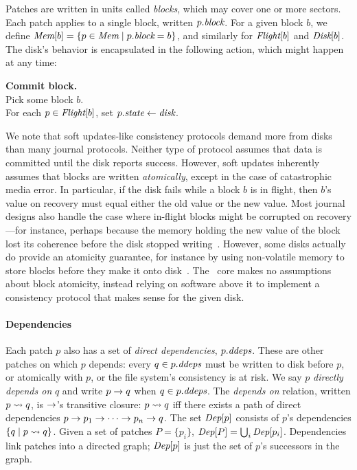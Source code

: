Patches are written in units called \emph{blocks}, which may cover one or
more sectors.
%
Each patch applies to a single block, written $p.\textit{block}$.
%
For a given block $b$, we define $\PMem[b] = \{p \in \PMem \mid \PBlock{p}
= b \}$, and similarly for $\PInf[b]$ and $\PDisk[b]$.
%
The disk's behavior is encapsulated in the following action,
which might happen at any time:

\begin{tabbing}
\quad \textbf{Commit block.} \\
\qquad Pick some block $b$. \\
\qquad For each $p \in \PInf[b]$, set $p.\textit{state} \gets \textit{disk}$.
\end{tabbing}


We note that soft updates-like consistency protocols demand more from disks
than many journal protocols.
%
Neither type of protocol assumes that data is committed until the disk
reports success.
%
However, soft updates inherently assumes that blocks are written
\emph{atomically}, except in the case of catastrophic media error.
%
In particular, if the disk fails while a block $b$ is in flight, then $b$'s
value on recovery must equal either the old value or the new value.
%
Most journal designs also handle the case where in-flight blocks might be
corrupted on recovery---for instance, perhaps because the memory holding
the new value of the block lost its coherence before the disk stopped
writing~\cite{tso}.
%
However, some disks actually do provide an atomicity guarantee, for
instance by using non-volatile memory to store blocks before they make it
onto disk~\cite{???}.
%
The \Kudos\ core makes no assumptions about block atomicity, instead relying
on software above it to implement a consistency protocol that makes sense
for the given disk.


\paragraph{Dependencies}
%
Each patch $p$ also has a set of \emph{direct dependencies}, $\PDDepset{p}$.
%
These are other patches on which $p$ depends: every $q \in \PDDepset{p}$
must be written to disk before $p$, or atomically with $p$, or the file
system's consistency is at risk.
%
We say $p$ \emph{directly depends on} $q$ and write $p \rightarrow q$ when $q
\in \PDDepset{p}$.
%
The \emph{depends on} relation, written $p \leadsto q$, is $\rightarrow$'s
transitive closure: $p \leadsto q$ iff there exists a path of direct
dependencies $p \rightarrow p_1 \rightarrow \cdots \rightarrow p_n \rightarrow q$.
%
The set $\textit{Dep}[p]$ consists of $p$'s dependencies $\{q \mid p \leadsto
q \}$.
%
Given a set of patches $P = \{p_i\}$, $\textit{Dep}[P] = \bigcup_i
\textit{Dep}[p_i]$.
%
Dependencies link patches into a directed graph; $\textit{Dep}[p]$ is just the
set of $p$'s successors in the graph.


